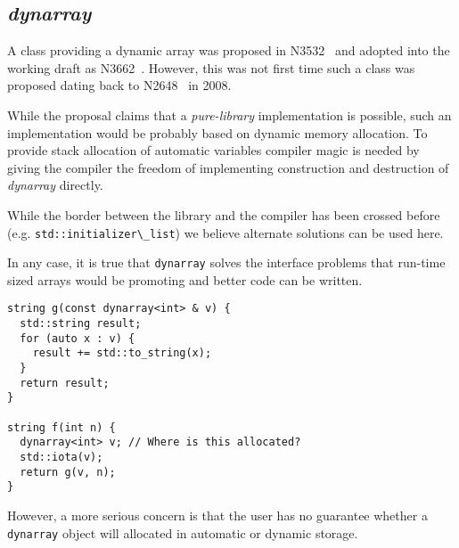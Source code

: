 \subsection{\emph{dynarray}}

A class providing a dynamic array was proposed in N3532~\cite{n3532} and adopted
into the working draft as N3662~\cite{n3662}. However, this was not first time
such a class was proposed dating back to N2648~\cite{n2648} in 2008.

While the proposal claims that a \emph{pure-library} implementation is possible,
such an implementation would be probably based on dynamic memory allocation. To
provide stack allocation of automatic variables compiler magic is needed by
giving the compiler the freedom of implementing construction and destruction of
\emph{dynarray} directly.

While the border between the library and the compiler has been crossed before
(e.g. \verb+std::initializer\_list+) we believe alternate solutions can be used
here. 

In any case, it is true that \verb+dynarray+ solves the interface problems that
run-time sized arrays would be promoting and better code can be written.

\begin{lstlisting}
string g(const dynarray<int> & v) {
  std::string result;
  for (auto x : v) {
    result += std::to_string(x);
  }
  return result;
}

string f(int n) {
  dynarray<int> v; // Where is this allocated?
  std::iota(v);
  return g(v, n);
} 
\end{lstlisting}

However, a more serious concern is that the user has no guarantee whether
a \verb+dynarray+ object will allocated in automatic or dynamic storage.



